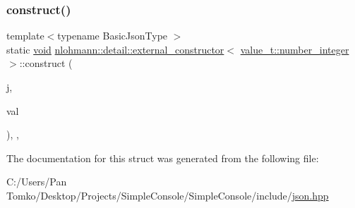 \subsubsection{\texorpdfstring{construct()}{construct()}}
{\footnotesize\ttfamily template$<$typename Basic\+Json\+Type $>$ \\
static \mbox{\hyperlink{namespacenlohmann_1_1detail_a59fca69799f6b9e366710cb9043aa77d}{void}} \mbox{\hyperlink{structnlohmann_1_1detail_1_1external__constructor}{nlohmann\+::detail\+::external\+\_\+constructor}}$<$ \mbox{\hyperlink{namespacenlohmann_1_1detail_a1ed8fc6239da25abcaf681d30ace4985a5763da164f8659d94a56e29df64b4bcc}{value\+\_\+t\+::number\+\_\+integer}} $>$\+::construct (\begin{DoxyParamCaption}\item[{Basic\+Json\+Type \&}]{j,  }\item[{typename Basic\+Json\+Type\+::number\+\_\+integer\+\_\+t}]{val }\end{DoxyParamCaption})\hspace{0.3cm}{\ttfamily [inline]}, {\ttfamily [static]}, {\ttfamily [noexcept]}}



The documentation for this struct was generated from the following file\+:\begin{DoxyCompactItemize}
\item 
C\+:/\+Users/\+Pan Tomko/\+Desktop/\+Projects/\+Simple\+Console/\+Simple\+Console/include/\mbox{\hyperlink{json_8hpp}{json.\+hpp}}\end{DoxyCompactItemize}
